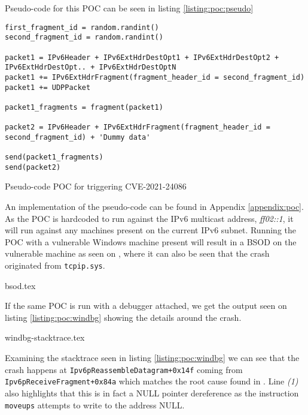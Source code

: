 \documentclass{report}
\begin{document}
Pseudo-code for this \gls{POC} can be seen in listing \ref{listing:poc:pseudo}

\begin{listing}[H]
\begin{verbatim}
first_fragment_id = random.randint()
second_fragment_id = random.randint()

packet1 = IPv6Header + IPv6ExtHdrDestOpt1 + IPv6ExtHdrDestOpt2 + IPv6ExtHdrDestOpt.. + IPv6ExtHdrDestOptN
packet1 += IPv6ExtHdrFragment(fragment_header_id = second_fragment_id)
packet1 += UDPPacket

packet1_fragments = fragment(packet1)

packet2 = IPv6Header + IPv6ExtHdrFragment(fragment_header_id = second_fragment_id) + 'Dummy data'

send(packet1_fragments)
send(packet2)
\end{verbatim}
\caption{Pseudo-code \gls{POC} for triggering CVE-2021-24086}
\label{listing:poc:pseudo}
\end{listing}

An implementation of the pseudo-code can be found in Appendix \ref{appendix:poc}. As the \gls{POC} is hardcoded to run against the IPv6 multicast address, \emph{ff02::1}, it will run against any machines present on the current IPv6 subnet. Running the \gls{POC} with a vulnerable Windows machine present will result in a \gls{BSOD} on the vulnerable machine as seen on , where it can also be seen that the crash originated from \texttt{tcpip.sys}.

{bsod.tex}

If the same \gls{POC} is run with a debugger attached, we get the output seen on listing \ref{listing:poc:windbg} showing the details around the crash.

{windbg-stacktrace.tex}

Examining the stacktrace seen in listing \ref{listing:poc:windbg} we can see that the crash happens at \texttt{Ipv6pReassembleDatagram+0x14f} coming from \texttt{Ipv6pReceiveFragment+0x84a} which matches the root cause found in . Line \emph{(1)} also highlights that this is in fact a NULL pointer dereference as the instruction \texttt{moveups} attempts to write to the address NULL.
\end{document}
